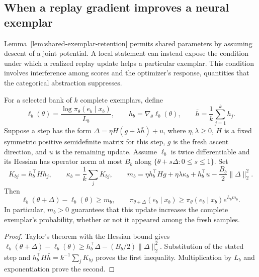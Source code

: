\subsection{When a replay gradient improves a neural exemplar}
\label{app:theory-neural-replay-response}

Lemma~\ref{lem:shared-exemplar-retention} permits shared parameters by
assuming descent of a joint potential. A local statement can instead expose
the condition under which a realized replay update helps a particular
exemplar. This condition involves interference among scores and the optimizer's
response, quantities that the categorical abstraction suppresses.

\begin{proposition}
\label{prop:neural-replay-local-response}
For a selected bank of $k$ complete exemplars, define
\[
 \ell_b(\theta)=\frac{\log\pi_\theta(e_b\mid x_b)}{L_b},\qquad
 h_b=\nabla_\theta\ell_b(\theta),\qquad
 \bar h=\frac1k\sum_{j=1}^k h_j.
\]
Suppose a step has the form
$\Delta=\eta H(g+\lambda\bar h)+u$, where $\eta,\lambda\ge0$,
$H$ is a fixed symmetric positive semidefinite matrix for this step,
$g$ is the fresh ascent direction, and $u$ is the remaining update.
Assume $\ell_b$ is twice differentiable and its Hessian has operator norm
at most $B_b$ along $\{\theta+s\Delta:0\le s\le1\}$.
Set
\[
 K_{bj}=h_b^\top Hh_j,\qquad
 \kappa_b=\frac1k\sum_jK_{bj},\qquad
 m_b=\eta h_b^\top Hg+\eta\lambda\kappa_b
       +h_b^\top u-\frac{B_b}{2}\|\Delta\|_2^2.
\]
Then
\begin{equation}
 \ell_b(\theta+\Delta)-\ell_b(\theta)\ge m_b,
 \qquad
 \pi_{\theta+\Delta}(e_b\mid x_b)
    \ge\pi_\theta(e_b\mid x_b)e^{L_bm_b}.
 \label{eq:neural-replay-local-response}
\end{equation}
In particular, $m_b>0$ guarantees that this update increases the complete
exemplar's probability, whether or not it appeared among the fresh samples.
\end{proposition}

\begin{proof}
Taylor's theorem with the Hessian bound gives
$\ell_b(\theta+\Delta)-\ell_b(\theta)
 \ge h_b^\top\Delta-(B_b/2)\|\Delta\|_2^2$.
Substitution of the stated step and
$h_b^\top H\bar h=k^{-1}\sum_jK_{bj}$ proves the first inequality.
Multiplication by $L_b$ and exponentiation prove the second.
\end{proof}

